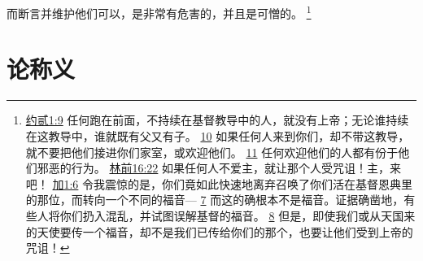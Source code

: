 \documentclass[12pt, a4paper, oneside]{ctexart}
\begin{document}
	而断言并维护他们可以，是非常有危害的，并且是可憎的。
	\footnote {
		\href{https://biblehub.com/2_john/1-9.htm}{约贰1:9} 任何跑在前面，不持续在基督教导中的人，就没有上帝；无论谁持续在这教导中，谁就既有父又有子。
		\href{https://biblehub.com/2_john/1-10.htm}{10} 如果任何人来到你们，却不带这教导，就不要把他们接进你们家室，或欢迎他们。
		\href{https://biblehub.com/2_john/1-11.htm}{11} 任何欢迎他们的人都有份于他们邪恶的行为。
		\href{https://biblehub.com/1_corinthians/16-22.htm}{林前16:22} 如果任何人不爱主，就让那个人受咒诅！主，来吧！
		\href{https://biblehub.com/galatians/1-6.htm}{加1:6} 令我震惊的是，你们竟如此快速地离弃召唤了你们活在基督恩典里的那位，而转向一个不同的福音---
		\href{https://biblehub.com/galatians/1-7.htm}{7} 而这的确根本不是福音。证据确凿地，有些人将你们扔入混乱，并试图误解基督的福音。
		\href{https://biblehub.com/galatians/1-8.htm}{8} 但是，即使我们或从天国来的天使要传一个福音，却不是我们已传给你们的那个，也要让他们受到上帝的咒诅！
	}

\section{论称义}
\end{document}
